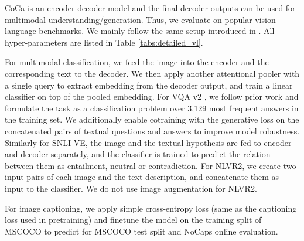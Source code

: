 \documentclass{article}
\begin{document}
CoCa is an encoder-decoder model and the final decoder outputs can be used for multimodal understanding/generation.
Thus, we evaluate on popular vision-language benchmarks.
We mainly follow the same setup introduced in \cite{wang2021simvlm}.
All hyper-parameters are listed in Table \ref{tabs:detailed_vl}.

For multimodal classification,
we feed the image into the encoder and the corresponding text to the decoder.
We then apply another attentional pooler with a single query to extract embedding from the decoder output, and train a linear classifier on top of the pooled embedding.
For VQA v2 \citep{goyal2017making}, we follow prior work and formulate the task as a classification problem over 3,129 most frequent answers in the training set.
We additionally enable cotraining with the generative loss on the concatenated pairs of textual questions and answers to improve model robustness.
Similarly for SNLI-VE,
the image and the textual hypothesis are fed to encoder and decoder separately,
and the classifier is trained to predict the relation between them as entailment, neutral or contradiction.
For NLVR2,
we create two input pairs of each image and the text description,
and concatenate them as input to the classifier.
We do not use image augmentation for NLVR2.

For image captioning,
we apply simple cross-entropy loss (same as the captioning loss used in pretraining) and finetune the model on the training split of MSCOCO to predict for MSCOCO test split and NoCaps online evaluation.
\end{document}
